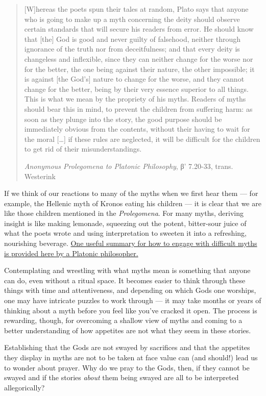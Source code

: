 \documentclass[
]{book}
\begin{document}
\begin{quote}
{[}W{]}hereas the poets spun their tales at random, Plato says that anyone who is going to make up a myth concerning the deity should observe certain standards that will secure his readers from error. He should know that {[}the{]} God is good and never guilty of falsehood, neither through ignorance of the truth nor from deceitfulness; and that every deity is changeless and inflexible, since they can neither change for the worse nor for the better, the one being against their nature, the other impossible; it is against {[}the God's{]} nature to change for the worse, and they cannot change for the better, being by their very essence superior to all things. This is what we mean by the propriety of his myths. Readers of myths should bear this in mind, to prevent the children from suffering harm: as soon as they plunge into the story, the good purpose should be immediately obvious from the contents, without their having to wait for the moral {[}\ldots{]} if these rules are neglected, it will be difficult for the children to get rid of their misunderstandings.

\emph{Anonymous Prolegomena to Platonic Philosophy}, β' 7.20-33, trans. Westerink
\end{quote}

If we think of our reactions to many of the myths when we first hear them --- for example, the Hellenic myth of Kronos eating his children --- it is clear that we are like those children mentioned in the \emph{Prolegomena}. For many myths, deriving insight is like making lemonade, squeezing out the potent, bitter-sour juice of what the poets wrote and using interpretation to sweeten it into a refreshing, nourishing beverage. \href{https://endymions-bower.dreamwidth.org/57262.html}{One useful summary for how to engage with difficult myths is provided here by a Platonic philosopher.}

Contemplating and wrestling with what myths mean is something that anyone can do, even without a ritual space. It becomes easier to think through these things with time and attentiveness, and depending on which Gods one worships, one may have intricate puzzles to work through --- it may take months or years of thinking about a myth before you feel like you've cracked it open. The process is rewarding, though, for overcoming a shallow view of myths and coming to a better understanding of how appetites are not what they seem in these stories.

Establishing that the Gods are not swayed by sacrifices and that the appetites they display in myths are not to be taken at face value can (and should!) lead us to wonder about prayer. Why do we pray to the Gods, then, if they cannot be swayed and if the stories \emph{about} them being swayed are all to be interpreted allegorically?
\end{document}
